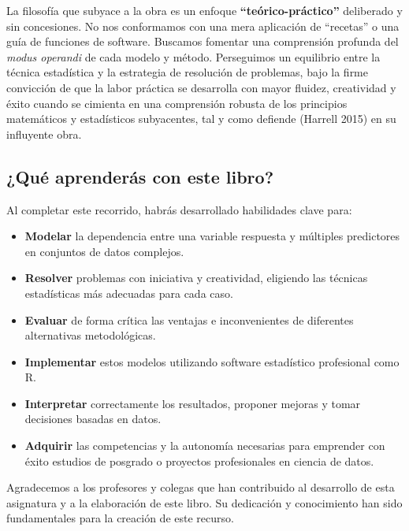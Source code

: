 \documentclass[
  letterpaper,
  DIV=11,
  numbers=noendperiod]{scrreprt}
\providecommand{\tightlist}{%
  \setlength{\itemsep}{0pt}\setlength{\parskip}{0pt}}
\begin{document}

La filosofía que subyace a la obra es un enfoque
\textbf{``teórico-práctico''} deliberado y sin concesiones. No nos
conformamos con una mera aplicación de ``recetas'' o una guía de
funciones de software. Buscamos fomentar una comprensión profunda del
\emph{modus operandi} de cada modelo y método. Perseguimos un equilibrio
entre la técnica estadística y la estrategia de resolución de problemas,
bajo la firme convicción de que la labor práctica se desarrolla con
mayor fluidez, creatividad y éxito cuando se cimienta en una comprensión
robusta de los principios matemáticos y estadísticos subyacentes, tal y
como defiende (Harrell 2015) en su influyente obra.

\subsection*{¿Qué aprenderás con este
libro?}\label{quuxe9-aprenderuxe1s-con-este-libro}

Al completar este recorrido, habrás desarrollado habilidades clave para:

\begin{itemize}
\tightlist
\item
  \textbf{Modelar} la dependencia entre una variable respuesta y
  múltiples predictores en conjuntos de datos complejos.
\item
  \textbf{Resolver} problemas con iniciativa y creatividad, eligiendo
  las técnicas estadísticas más adecuadas para cada caso.
\item
  \textbf{Evaluar} de forma crítica las ventajas e inconvenientes de
  diferentes alternativas metodológicas.
\item
  \textbf{Implementar} estos modelos utilizando software estadístico
  profesional como R.
\item
  \textbf{Interpretar} correctamente los resultados, proponer mejoras y
  tomar decisiones basadas en datos.
\item
  \textbf{Adquirir} las competencias y la autonomía necesarias para
  emprender con éxito estudios de posgrado o proyectos profesionales en
  ciencia de datos.
\end{itemize}

Agradecemos a los profesores y colegas que han contribuido al desarrollo
de esta asignatura y a la elaboración de este libro. Su dedicación y
conocimiento han sido fundamentales para la creación de este recurso.
\end{document}
